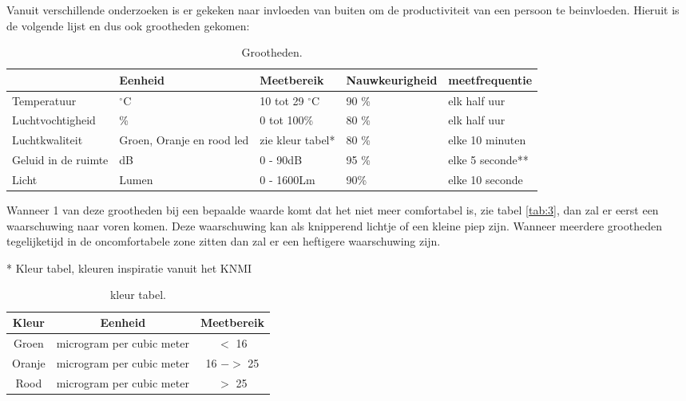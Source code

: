 Vanuit verschillende onderzoeken is er gekeken naar invloeden van buiten om de productiviteit van een persoon te beinvloeden. \cite{productiviteit} 
Hieruit is de volgende lijst en dus ook grootheden gekomen:

\begin{table}[ht]
    \begin{tabular}{p{3.3cm}||p{3cm}|p{3cm}|p{3cm}|p{3cm}}
         & Eenheid & Meetbereik & Nauwkeurigheid & meetfrequentie\\
         \hline
        Temperatuur &  $^{\circ}$C  & 10 tot 29 $^{\circ}$C & 90 \% & elk half uur\\
        Luchtvochtigheid & \% & 0 tot 100\%& 80 \% & elk half uur\\
        Luchtkwaliteit & Groen, Oranje en rood led & zie kleur tabel*& 80 \% & elke 10 minuten\\
        Geluid in de ruimte & dB & 0 - 90dB & 95 \% & elke 5 seconde**\\
        Licht & Lumen & 0 - 1600Lm & 90\% & elke 10 seconde
    \end{tabular}
    \caption{Grootheden.}
    \label{tab:1}
\end{table}


 \vspace{1cm}
Wanneer 1 van deze grootheden bij een bepaalde waarde komt dat het niet meer comfortabel is, zie tabel \ref{tab:3}, dan zal er eerst een waarschuwing naar voren komen. Deze waarschuwing kan als knipperend lichtje of een kleine piep zijn. Wanneer meerdere grootheden tegelijketijd in de oncomfortabele zone zitten dan zal er een heftigere waarschuwing zijn. 

\vspace{1.5cm}
* Kleur tabel, kleuren inspiratie vanuit het KNMI \cite{Gezonde} \\

\begin{table}[ht]
    \begin{tabular}{c|c|c}
       Kleur & Eenheid & Meetbereik \\
       \hline
       Groen  &  microgram per cubic meter & $ < $ 16\\
       Oranje  &  microgram per cubic meter & 16 $->$ 25\\
       Rood & microgram per cubic meter & $>$ 25
    \end{tabular}
    \caption{kleur tabel.}
    \label{tab:2}
\end{table}

\vspace{0.2cm}


